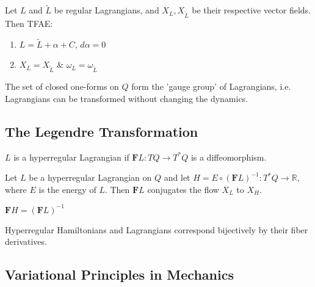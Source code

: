 \begin{thm}

Let $L$ and $\tilde{L}$ be regular Lagrangians, and $X_L, X_{\tilde{L}}$ be their respective vector fields. Then TFAE:

\begin{enumerate}
    \item $L = \tilde{L} + \alpha + C$, $d \alpha = 0$
    \item $ X_L = X_{\tilde{L}} $ \& $ \omega_L = \omega_{\tilde{L}} $
\end{enumerate}

\end{thm}

The set of closed one-forms on $Q$ form the 'gauge group' of Lagrangians, i.e. Lagrangians can be transformed without changing the dynamics.

\subsection{The Legendre Transformation}

\begin{defn}

$L$ is a hyperregular Lagrangian if $\textbf{F}L: TQ \to T^*Q$ is a diffeomorphism.

\end{defn}

\begin{thm}

Let $L$ be a hyperregular Lagrangian on $Q$ and let $H = E \circ (\textbf{F}L)^{-1}: T^*Q \to \mathbb{R}$, where $E$ is the energy of $L$. Then $\textbf{F}L$ conjugates the flow $X_L$ to $X_H$.

\end{thm}

\begin{thm}

$\textbf{F}H = (\textbf{F}L)^{-1}$

\end{thm}

\begin{cor}

Hyperregular Hamiltonians and Lagrangians correspond bijectively by their fiber derivatives.

\end{cor}

\subsection{Variational Principles in Mechanics}

